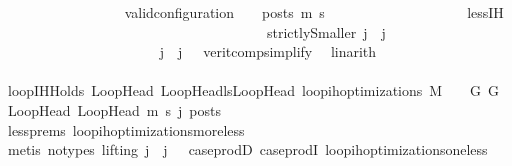 \begin{isabellebody}
\ \ \ \ \ \ \ \ \ \ \ \ \ \ \ \ \isamarkupfalse%
\ {\isachardoublequoteopen}valid{\isacharunderscore}{\kern0pt}configuration\ {\isasymLambda}\ {\isasymGamma}\ {\isasymOmega}\ posts\ m{\isacharprime}{\kern0pt}\ s{\isacharprime}{\kern0pt}{\isachardoublequoteclose}\isanewline
\ \ \ \ \ \ \ \ \ \ \ \ \ \ \ \ \ \ \isamarkupfalse%
\ less{\isachardot}{\kern0pt}IH\isanewline
\ \ \ \ \ \ \ \ \ \ \ \ \ \ \ \ \isamarkupfalse%
\ {\isacharminus}{\kern0pt}\isanewline
\ \ \ \ \ \ \ \ \ \ \ \ \ \ \ \ \ \ \isamarkupfalse%
\ strictlySmaller{\isacharcolon}{\kern0pt}\ {\isachardoublequoteopen}j{\isacharprime}{\kern0pt}\ {\isacharless}{\kern0pt}\ j{\isachardoublequoteclose}\ \isanewline
\ \ \ \ \ \ \ \ \ \ \ \ \ \ \ \ \ \ \ \ \isamarkupfalse%
\ {\isachardoublequoteopen}{}{\isachardoublequoteclose}{\isacharparenleft}{\kern0pt}{}{\isacharparenright}{\kern0pt}\ {\isacartoucheopen}j{\isacharprime}{\kern0pt}\ {\isasymle}\ j\ {\isacharminus}{\kern0pt}\ {}{\isacartoucheclose}\ verit{\isacharunderscore}{\kern0pt}comp{\isacharunderscore}{\kern0pt}simplify{}{\isacharparenleft}{\kern0pt}{}{\isacharparenright}{\kern0pt}\ \isamarkupfalse%
\ linarith\isanewline
\ \ \ \ \ \ \ \ \ \ \ \ \ \ \ \ \ \ \isamarkupfalse%
\ loopIHHolds{\isacharcolon}{\kern0pt}\ {\isachardoublequoteopen}{\isasymforall}{\isacharparenleft}{\kern0pt}LoopHead{\isacharcomma}{\kern0pt}\ LoopHead{\isacharprime}{\kern0pt}{\isacharparenright}{\kern0pt}{\isasymin}lsLoopHead{\isachardot}{\kern0pt}\ loop{\isacharunderscore}{\kern0pt}ih{\isacharunderscore}{\kern0pt}optimizations\ M\ {\isasymLambda}\ {\isasymGamma}\ {\isasymOmega}\ G\ G{\isacharprime}{\kern0pt}\ LoopHead\ LoopHead{\isacharprime}{\kern0pt}\ m{\isacharprime}{\kern0pt}\ s{\isacharprime}{\kern0pt}\ j{\isacharprime}{\kern0pt}\ posts{\isachardoublequoteclose}\isanewline
\ \ \ \ \ \ \ \ \ \ \ \ \ \ \ \ \ \ \ \ \isamarkupfalse%
\ less{\isachardot}{\kern0pt}prems{\isacharparenleft}{\kern0pt}{}{\isacharparenright}{\kern0pt}\ loop{\isacharunderscore}{\kern0pt}ih{\isacharunderscore}{\kern0pt}optimizations{\isacharunderscore}{\kern0pt}more{\isacharunderscore}{\kern0pt}less\isanewline
\ \ \ \ \ \ \ \ \ \ \ \ \ \ \ \ \ \ \ \ \isamarkupfalse%
\ {\isacharparenleft}{\kern0pt}metis\ {\isacharparenleft}{\kern0pt}no{\isacharunderscore}{\kern0pt}types{\isacharcomma}{\kern0pt}\ lifting{\isacharparenright}{\kern0pt}\ {\isacartoucheopen}j{\isacharprime}{\kern0pt}\ {\isasymle}\ j\ {\isacharminus}{\kern0pt}\ {}{\isacartoucheclose}\ case{\isacharunderscore}{\kern0pt}prodD\ case{\isacharunderscore}{\kern0pt}prodI{}\ loop{\isacharunderscore}{\kern0pt}ih{\isacharunderscore}{\kern0pt}optimizations{\isacharunderscore}{\kern0pt}one{\isacharunderscore}{\kern0pt}less{\isacharparenright}{\kern0pt}\isanewline

\end{isabellebody}
